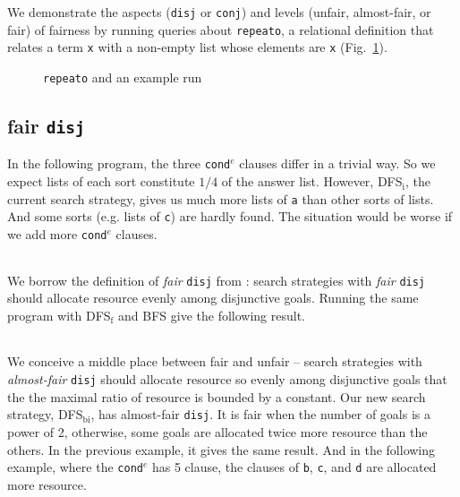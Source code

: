 \documentclass[format=acmlarge, review=true, authordraft=true]{acmart}
\newcommand{\conde}{\texttt{cond$^e$} }
\newcommand{\conj}{\texttt{conj}}
\newcommand{\disj}{\texttt{disj}}
\begin{document}
We demonstrate the aspects (\disj{} or \conj{}) and levels (unfair, 
almost-fair, or fair) of fairness by running queries about \texttt{repeato}, a 
relational definition that relates a term \texttt{x} with a non-empty list 
whose elements are \texttt{x} (Fig.~\ref{repeato}).

\begin{figure}
	
	\caption{\texttt{repeato} and an example run}
	\label{repeato}
\end{figure}

\subsection{fair \texttt{disj}}

In the following program, the three \conde clauses differ in a trivial way. So 
we expect lists of each sort constitute $1/4$ of the answer list. However, 
DFS$_\textrm{i}$, the current search strategy, gives us much more lists of \texttt{a} than 
other sorts of lists. And some sorts (e.g. lists of \texttt{c}) are hardly 
found. The situation would be worse if we add more \conde clauses.

\begin{center}
	\begin{tabular}{c}
		
	\end{tabular}
\end{center}

We borrow the definition of \emph{fair} \disj{} from \cite{seres1999algebra}: 
search strategies with \emph{fair} \disj{} should allocate resource evenly 
among disjunctive goals. Running the same program with DFS$_\textrm{f}$ and BFS give the 
following result. 

\begin{center}
	\begin{tabular}{c}
		
	\end{tabular}
\end{center}

We conceive a middle place between fair and unfair -- search strategies with 
\emph{almost-fair} \disj{} should allocate resource so evenly among disjunctive 
goals\citep{seres1999algebra} that the the maximal ratio of resource is bounded 
by a constant. Our new search strategy, DFS$_\textrm{bi}$, has almost-fair \disj{}. It is 
fair when the number of goals is a power of 2, otherwise, some goals are 
allocated twice more resource than the others. In the previous example, it 
gives the same result. And in the following example, where the \conde has 5 
clause, the clauses of \texttt{b}, \texttt{c}, and \texttt{d} are allocated 
more resource.
\end{document}
